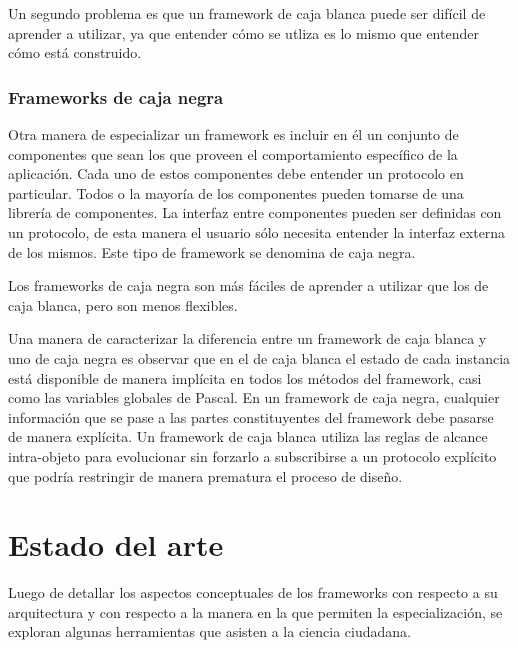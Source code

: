 	Un segundo problema es que un framework de caja blanca puede ser difícil de aprender a utilizar, ya que entender cómo se utliza es lo mismo que entender cómo está construido.\cite{johnson1988designing}
	
\subsubsection{Frameworks de caja negra}

	Otra manera de especializar un framework es incluir en él un conjunto de componentes que sean los que proveen el comportamiento específico de la aplicación. Cada uno de estos componentes debe entender un protocolo en particular. Todos o la mayoría de los componentes pueden tomarse de una librería de componentes. La interfaz entre componentes pueden ser definidas con un protocolo, de esta manera el usuario sólo necesita entender la interfaz externa de los mismos. Este tipo de framework se denomina de caja negra.
	
	Los frameworks de caja negra son más fáciles de aprender a utilizar que los de caja blanca, pero son menos flexibles. 
	
	Una manera de caracterizar la diferencia entre un framework de caja blanca y uno de caja negra es observar que en el de caja blanca el estado de cada instancia está disponible de manera implícita en todos los métodos del framework, casi como las variables globales de Pascal. En un framework de caja negra, cualquier información que se pase a las partes constituyentes del framework debe pasarse de manera explícita. Un framework de caja blanca utiliza las reglas de alcance intra-objeto para evolucionar sin forzarlo a subscribirse a un protocolo explícito que podría restringir de manera prematura el proceso de diseño.
 \cite{johnson1988designing}


\section{Estado del arte}
Luego de detallar los aspectos conceptuales de los frameworks con respecto a su arquitectura y con respecto a la manera en la que permiten la especialización, se exploran algunas herramientas que asisten a la ciencia ciudadana. 

